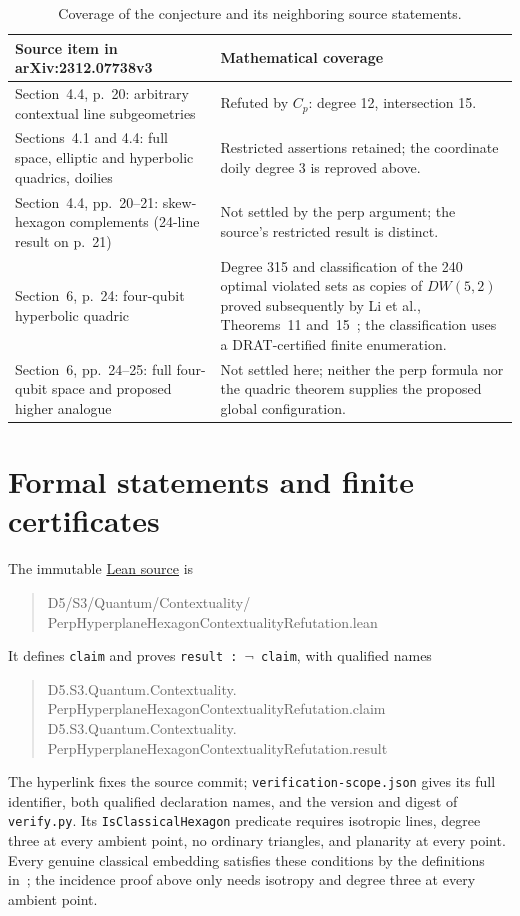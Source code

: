 \documentclass[10pt]{article}
\begin{document}
\begin{table}[ht]
\centering\small
\begin{tabular}{p{.43\linewidth}p{.50\linewidth}}
\toprule
Source item in arXiv:2312.07738v3&Mathematical coverage\\
\midrule
Section~4.4, p.~20: arbitrary contextual line subgeometries&
Refuted by $C_p$: degree 12, intersection 15.\\
Sections~4.1 and 4.4: full space, elliptic and hyperbolic quadrics, doilies&
Restricted assertions retained; the coordinate doily degree 3 is reproved above.\\
Section~4.4, pp.~20--21: skew-hexagon complements (24-line result on p.~21)&
Not settled by the perp argument; the source's restricted result is distinct.\\
Section~6, p.~24: four-qubit hyperbolic quadric&
Degree 315 and classification of the 240 optimal violated sets as copies of
$DW(5,2)$ proved subsequently by Li et al., Theorems~11 and~15~\cite{li};
the classification uses a DRAT-certified finite enumeration.\\
Section~6, pp.~24--25: full four-qubit space and proposed higher analogue&
Not settled here; neither the perp formula nor the quadric theorem supplies the proposed global configuration.\\
\bottomrule
\end{tabular}
\caption{Coverage of the conjecture and its neighboring source statements.}
\label{tab:coverage}
\end{table}

\section{Formal statements and finite certificates}\label{sec:scope}
The immutable \href{https://github.com/the-omega-institute/trureturing/blob/6715a5bea38a03c80f6c4da6de93fea88798f026/D5/S3/Quantum/Contextuality/PerpHyperplaneHexagonContextualityRefutation.lean}{Lean source}
is
\begin{quote}\small\ttfamily
D5/S3/Quantum/Contextuality/\\
PerpHyperplaneHexagonContextualityRefutation.lean
\end{quote}
It defines \texttt{claim} and proves \texttt{result : $\neg$ claim}, with qualified names
\begin{quote}\small\ttfamily
D5.S3.Quantum.Contextuality.\\
PerpHyperplaneHexagonContextualityRefutation.claim\\[2pt]
D5.S3.Quantum.Contextuality.\\
PerpHyperplaneHexagonContextualityRefutation.result
\end{quote}
The hyperlink fixes the source commit; \texttt{verification-scope.json} gives its full
identifier, both qualified declaration names, and the version and digest of
\texttt{verify.py}.
Its \texttt{IsClassicalHexagon} predicate requires isotropic lines, degree three
at every ambient point, no ordinary triangles, and planarity at every point.
Every genuine classical embedding satisfies these conditions by the
definitions in~\cite[Sections~2--3]{saniga}; the incidence proof above only
needs isotropy and degree three at every ambient point.
\end{document}

